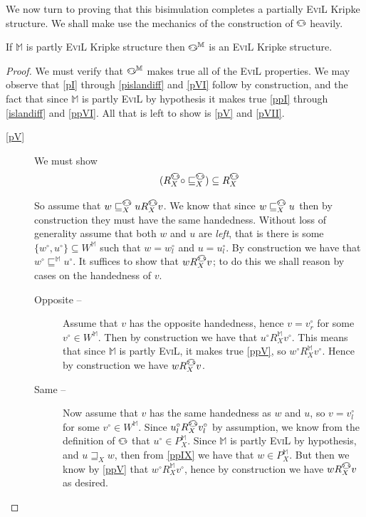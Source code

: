 We now turn to proving that this bisimulation completes a partially
\textsc{EviL} Kripke structure. We shall make use the mechanics of the 
 construction of $\invis$ heavily.

\begin{theorem}\label{EviL-Completion}
If $\mathbb{M}$ is partly \textsc{EviL} Kripke structure then
$\invis^\mathbb{M}$ is an \textsc{EviL} Kripke structure. 
\end{theorem}
\begin{proof}
We must verify that $\invis^\mathbb{M}$ makes true all of the
\textsc{EviL} properties.  We may observe that \ref{pI} through
\ref{pislandiff} and \ref{pVI} follow by construction, and 
the fact that since
$\mathbb{M}$ is partly \textsc{EviL} by hypothesis it makes true \ref{ppI} through
\ref{islandiff} and \ref{ppVI}.  All that is left to show is \ref{pV}
and \ref{pVII}.

  \begin{description}
    \item[\ref{pV}] We must show
$$(R^{\invis}_X \circ \sqsubseteq^{\invis}_X) \subseteq
    R^{\invis}_X $$

So assume that $w  \sqsubseteq^{\invis}_X u R^{\invis}_X v$. We know that since $w \sqsubseteq^{\invis}_X u$ then by construction
they must have the same handedness.  Without loss of generality assume
that both $w$ and $u$ are \emph{left}, that is there is some
$\{w^\circ,u^\circ\} \subseteq W^\mathbb{M}$ such that $w = w^\circ_l$
and $u = u^\circ_l$. By construction we have that $w^\circ
\sqsubseteq^\mathbb{M} u^\circ$.  It suffices to show that $w R_X^\invis
v$; to do this we shall reason by cases on the handedness of $v$.
  \begin{description}
\item[Opposite --] Assume that $v$ has the opposite handedness, hence $v = v^\circ_r$ for
some $v^\circ\in W^\mathbb{M}$. Then by construction we have that
$u^\circ R_X^\mathbb{M} v^\circ$.  This means that since
$\mathbb{M}$ is partly \textsc{EviL}, it makes true \ref{ppV}, so $w^\circ
R_X^\mathbb{M} v^\circ$.  Hence by construction we have $w R^\invis_X v$.
\item[Same --]  Now assume that $v$ has the same handedness as $w$ and
  $u$, so $v = v^\circ_l$ for some $v^\circ\in W^\mathbb{M}$.  Since
  $u^\circ_l R^\invis_X v^\circ_l$ by assumption, we know from the
  definition of $\invis$ that $u^\circ \in P_X^\mathbb{M}$.  Since
  $\mathbb{M}$ is partly \textsc{EviL} by hypothesis, and $u
  \sqsupseteq_X w$, then from \ref{ppIX} we have that $w \in
  P_X^\mathbb{M}$.  But then we know by \ref{ppV} that $w^\circ
  R^\mathbb{M}_X v^\circ$, hence by construction we have
   $w R^\invis_X v$ as desired.
\end{description}


\end{description}
\end{proof}
